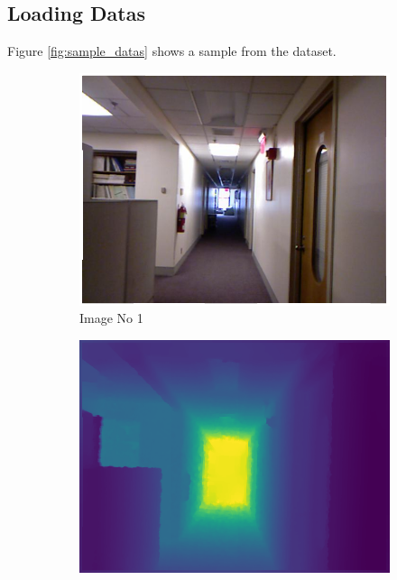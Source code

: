 \documentclass[a4paper, openany]{book}
\begin{document}
\subsection{Loading Datas}
Figure \ref{fig:sample_datas} shows a sample from the dataset.





\begin{figure}[ht]
  \centering
  \begin{subfigure}[b]{0.3\linewidth}
    \includegraphics[width=\linewidth]{images/imgNo14.png}
    \caption{Image No 1}
  \end{subfigure}
  \begin{subfigure}[b]{0.3\linewidth}
    \includegraphics[width=\linewidth]{images/depthNo14.png}

\end{subfigure}
\end{figure}
\end{document}
